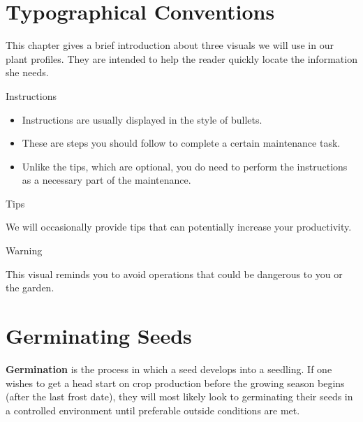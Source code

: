 \documentclass[12pt, oneside, a4paper]{memoir}
\newenvironment{instruction}[1]
    {\begin{bclogo}[logo=\textcolor{ForestGreen}{\faTree}, noborder=true, couleurBarre=ForestGreen]{#1}
    }
    { 
       
    \end{bclogo}
    }
\newenvironment{warning}{
    \begin{bclogo}[logo=\bcattention, couleurBarre=red, noborder=true, 
               couleur=LightSalmon]{Warning}
    }
    {
        \end{bclogo}
    }
\newenvironment{tip}{
    \begin{bclogo}[logo=\bcinfo, couleurBarre=orange, noborder=true, couleur=white]{Tips}
}
{
    \end{bclogo}
}
\begin{document}
\chapter{Typographical Conventions}
This chapter gives a brief introduction about three visuals we will use in our plant profiles. They are intended to help the reader quickly locate the information she needs. 
\begin{instruction}{Instructions}
    \begin{itemize}
        \item Instructions are usually displayed in the style of bullets.
        \item These are steps you should follow to complete a certain maintenance task.
        \item Unlike the tips, which are optional, you do need to perform the instructions as a necessary part of the maintenance.
    \end{itemize}
\end{instruction}


\begin{tip}
    We will occasionally provide tips that can potentially increase your productivity.
\end{tip}

\begin{warning}
    This visual reminds you to avoid operations that could be dangerous to you or the garden. 
\end{warning}





\chapter{Germinating Seeds}
    \begin{definition}
        \textbf{Germination} is the process in which a seed develops into a seedling.
If one wishes to get a head start on crop production before the growing season begins (after the last
frost date), they will most likely look to germinating their seeds in a controlled environment until
preferable outside conditions are met.
    \end{definition}
    
\end{document}
